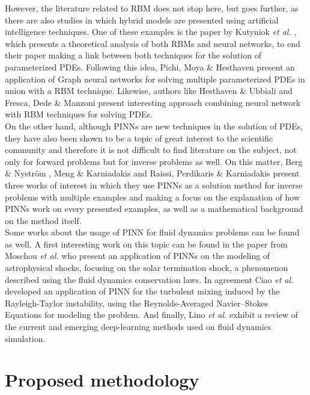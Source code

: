 \documentclass[12pt,letterpaper]{article}
\begin{document}
However, the literature related to RBM does not stop here, but goes further, as there are also studies in which hybrid models are presented using artificial intelligence techniques. One of these examples is the paper by Kutyniok \textit{et al.} \cite{kutyniok2022theoretical}, which presents a theoretical analysis of both RBMs and neural networks, to end their paper making a link between both techniques for the solution of parameterized PDEs. Following this idea, Pichi, Moya \& Hesthaven \cite{pichi2023graph} present an application of Graph neural networks for solving multiple parameterized PDEs in union with a RBM technique. Likewise, authors like Hesthaven \& Ubbiali \cite{hesthaven2018non} and Fresca, Dede \& Manzoni \cite{fresca2021comprehensive} present interesting approach combining neural network with RBM techniques for solving PDEs. \\

On the other hand, although PINNs are new techniques in the solution of PDEs, they have also been shown to be a topic of great interest to the scientific community and therefore it is not difficult to find literature on the subject, not only for forward problems but for inverse problems as well. On this matter, Berg \& Nyström \cite{berg2021neural} , Meng \& Karniadakis \cite{meng2020composite} and Raissi, Perdikaris \& Karniadakis \cite{raissi2019physics} present three works of interest in which they use PINNs as a solution method for inverse problems with multiple examples and making a focus on the explanation of how PINNs work on every presented examples, as well as a mathematical background on the method itself.\\

Some works about the usage of PINN for fluid dynamics problems can be found as well. A first interesting work on this topic can be found in the paper from Moschou \textit{et al.} \cite{moschou2023physics} who present an application of PINNs on the modeling of astrophysical shocks, focusing on the solar termination shock, a phenomenon described using the fluid dynamics conservation laws. In agreement Ciao \textit{et al.} \cite{xiao2023physics} developed an application of PINN for the turbulent mixing induced by the Rayleigh-Taylor instability, using the Reynolds-Averaged Navier–Stokes Equations for modeling the problem. And finally, Lino \textit{et al.} \cite{lino2023current} exhibit a review of the current and emerging deep-learning methods used on fluid dynamics simulation.

\section{Proposed methodology}
\end{document}
